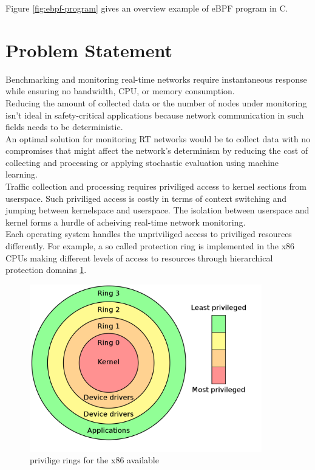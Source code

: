 Figure \ref{fig:ebpf-program} gives an overview example of eBPF program in C.\\

\section{Problem Statement}

Benchmarking and monitoring real-time networks require instantaneous response while ensuring no bandwidth, CPU, or memory consumption.\\
Reducing the amount of collected data or the number of nodes under monitoring isn't ideal in safety-critical applications
because network communication in such fields needs to be deterministic.\\
An optimal solution for monitoring RT networks would be to collect data with no compromises
that might affect the network's determinism by reducing the cost of collecting and processing or applying stochastic
evaluation using machine learning.\\
Traffic collection and processing requires priviliged access to kernel sections from userspace. Such priviliged access
is costly in terms of context switching and jumping between kernelspace and userspace. The isolation between userspace and kernel forms a hurdle
of acheiving real-time network monitoring.\\
Each operating system handles the unpriviliged access to priviliged resources differently.
For example, a so called protection ring is implemented in the x86 CPUs making different levels of access to resources
through hierarchical protection domains \ref{fig:x86-rings}.\\

\begin{figure}[H]
    \centering
    \includegraphics[width=0.9\textwidth]{resources/images/x86_protection_rings.png}
    \caption{privilige rings for the x86 available \cite{x86rings}}
    \label{fig:x86-rings}
\end{figure}


